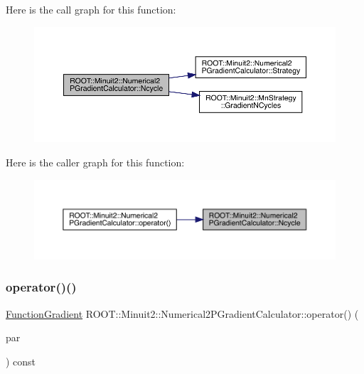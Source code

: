 Here is the call graph for this function\+:\nopagebreak
\begin{figure}[H]
\begin{center}
\leavevmode
\includegraphics[width=350pt]{d0/d82/classROOT_1_1Minuit2_1_1Numerical2PGradientCalculator_ace5b19ee0df4e3cd09333f519112d2b3_cgraph}
\end{center}
\end{figure}
Here is the caller graph for this function\+:\nopagebreak
\begin{figure}[H]
\begin{center}
\leavevmode
\includegraphics[width=350pt]{d0/d82/classROOT_1_1Minuit2_1_1Numerical2PGradientCalculator_ace5b19ee0df4e3cd09333f519112d2b3_icgraph}
\end{center}
\end{figure}
\mbox{\label{classROOT_1_1Minuit2_1_1Numerical2PGradientCalculator_a40aca4ad0b9583062fc830c359140b43}} 
\subsubsection{\texorpdfstring{operator()()}{operator()()}\hspace{0.1cm}{\footnotesize\ttfamily [1/6]}}
{\footnotesize\ttfamily \mbox{\hyperlink{classROOT_1_1Minuit2_1_1FunctionGradient}{Function\+Gradient}} R\+O\+O\+T\+::\+Minuit2\+::\+Numerical2\+P\+Gradient\+Calculator\+::operator() (\begin{DoxyParamCaption}\item[{const \mbox{\hyperlink{classROOT_1_1Minuit2_1_1MinimumParameters}{Minimum\+Parameters}} \&}]{par }\end{DoxyParamCaption}) const\hspace{0.3cm}{\ttfamily [virtual]}}



